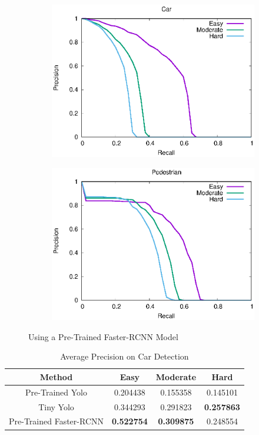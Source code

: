 \begin{figure}[H]
\begin{subfigure}{.5\textwidth}
    \includegraphics[width=1.0\linewidth]{img/FRCNN_Nov_8/plot_valid/car_detection.eps}
\end{subfigure}%
\begin{subfigure}{.5\textwidth}
    \centering
    \includegraphics[width=1.0\linewidth]{img/FRCNN_Nov_8/plot_valid/pedestrian_detection.eps}
\end{subfigure}
\caption{Using a Pre-Trained Faster-RCNN Model}
\end{figure}


\begin{table}[h!]
\centering
\begin{tabular}{ c | c | c | c }
\hline
Method & Easy & Moderate & Hard \\
\hline \hline
Pre-Trained Yolo & 0.204438 & 0.155358 & 0.145101 \\
Tiny Yolo & 0.344293 & 0.291823 & \bfseries 0.257863 \\
Pre-Trained Faster-RCNN & \bfseries 0.522754 & \bfseries 0.309875 & 0.248554 \\
\hline
\end{tabular}
\caption{Average Precision on Car Detection}
\end{table}

